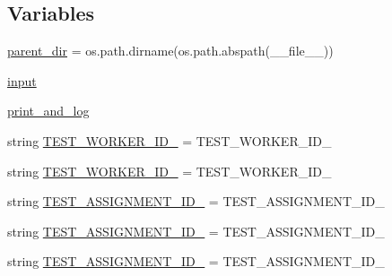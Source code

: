 \subsection*{Variables}
\begin{DoxyCompactItemize}
\item 
\hyperlink{namespaceparlai_1_1mturk_1_1core_1_1legacy__2018_1_1test_1_1test__full__system_afc64cd9ff3a6dc47434ca5669afe3604}{parent\+\_\+dir} = os.\+path.\+dirname(os.\+path.\+abspath(\+\_\+\+\_\+file\+\_\+\+\_\+))
\item 
\hyperlink{namespaceparlai_1_1mturk_1_1core_1_1legacy__2018_1_1test_1_1test__full__system_a9255a5fb54a07061de98fd3f94f1c8e3}{input}
\item 
\hyperlink{namespaceparlai_1_1mturk_1_1core_1_1legacy__2018_1_1test_1_1test__full__system_a77fb4096df794d13fa633690fe76ef13}{print\+\_\+and\+\_\+log}
\item 
string \hyperlink{namespaceparlai_1_1mturk_1_1core_1_1legacy__2018_1_1test_1_1test__full__system_a6ee9389f409e90e798d5fb01d32167fd}{T\+E\+S\+T\+\_\+\+W\+O\+R\+K\+E\+R\+\_\+\+I\+D\+\_} = \textquotesingle{}T\+E\+S\+T\+\_\+\+W\+O\+R\+K\+E\+R\+\_\+\+I\+D\+\_\textquotesingle{}
\item 
string \hyperlink{namespaceparlai_1_1mturk_1_1core_1_1legacy__2018_1_1test_1_1test__full__system_a1577f8b9d7fba9928f7357e17d0ea792}{T\+E\+S\+T\+\_\+\+W\+O\+R\+K\+E\+R\+\_\+\+I\+D\+\_} = \textquotesingle{}T\+E\+S\+T\+\_\+\+W\+O\+R\+K\+E\+R\+\_\+\+I\+D\+\_\textquotesingle{}
\item 
string \hyperlink{namespaceparlai_1_1mturk_1_1core_1_1legacy__2018_1_1test_1_1test__full__system_ab2bf275d4f6b9175c6df14b1fec0a993}{T\+E\+S\+T\+\_\+\+A\+S\+S\+I\+G\+N\+M\+E\+N\+T\+\_\+\+I\+D\+\_} = \textquotesingle{}T\+E\+S\+T\+\_\+\+A\+S\+S\+I\+G\+N\+M\+E\+N\+T\+\_\+\+I\+D\+\_\textquotesingle{}
\item 
string \hyperlink{namespaceparlai_1_1mturk_1_1core_1_1legacy__2018_1_1test_1_1test__full__system_a7fdabe4386f39ac736a32f659cbe59f3}{T\+E\+S\+T\+\_\+\+A\+S\+S\+I\+G\+N\+M\+E\+N\+T\+\_\+\+I\+D\+\_} = \textquotesingle{}T\+E\+S\+T\+\_\+\+A\+S\+S\+I\+G\+N\+M\+E\+N\+T\+\_\+\+I\+D\+\_\textquotesingle{}
\item 
string \hyperlink{namespaceparlai_1_1mturk_1_1core_1_1legacy__2018_1_1test_1_1test__full__system_ae58e002416984ec283a8174363ced295}{T\+E\+S\+T\+\_\+\+A\+S\+S\+I\+G\+N\+M\+E\+N\+T\+\_\+\+I\+D\+\_} = \textquotesingle{}T\+E\+S\+T\+\_\+\+A\+S\+S\+I\+G\+N\+M\+E\+N\+T\+\_\+\+I\+D\+\_\textquotesingle{}
\item 

\end{DoxyCompactItemize}

